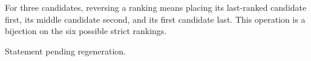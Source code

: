 \begin{definition}
\label{FABL.rankingReversal}
\leanok
{}
For three candidates, reversing a ranking means placing its last-ranked candidate first,
its middle candidate second, and its first candidate last. This operation is a bijection
on the six possible strict rankings.
\end{definition}

\begin{theorem}
\label{FABL.expect_rankingPreference}
\leanok
{}
Statement pending regeneration.
\end{theorem}

